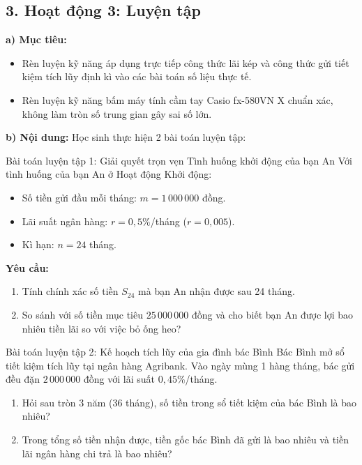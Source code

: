\documentclass[12pt, a4paper]{article}
\begin{document}
\subsection*{3. Hoạt động 3: Luyện tập}

\noindent \textbf{a) Mục tiêu:}
\begin{itemize}
    \item Rèn luyện kỹ năng áp dụng trực tiếp công thức lãi kép và công thức gửi tiết kiệm tích lũy định kì vào các bài toán số liệu thực tế.
    \item Rèn luyện kỹ năng bấm máy tính cầm tay Casio fx-580VN X chuẩn xác, không làm tròn số trung gian gây sai số lớn.
\end{itemize}

\noindent \textbf{b) Nội dung:}
Học sinh thực hiện 2 bài toán luyện tập:

\begin{pedabox}{Bài toán luyện tập 1: Giải quyết trọn vẹn Tình huống khởi động của bạn An}
    Với tình huống của bạn An ở Hoạt động Khởi động:
    \begin{itemize}
        \item Số tiền gửi đầu mỗi tháng: $m = 1\,000\,000$ đồng.
        \item Lãi suất ngân hàng: $r = 0{,}5\%$/tháng ($r = 0{,}005$).
        \item Kì hạn: $n = 24$ tháng.
    \end{itemize}
    \textbf{Yêu cầu:}
    \begin{enumerate}
        \item Tính chính xác số tiền $S_{24}$ mà bạn An nhận được sau 24 tháng.
        \item So sánh với số tiền mục tiêu $25\,000\,000$ đồng và cho biết bạn An được lợi bao nhiêu tiền lãi so với việc bỏ ống heo?
    \end{enumerate}
\end{pedabox}

\begin{pedabox}{Bài toán luyện tập 2: Kế hoạch tích lũy của gia đình bác Bình}
    Bác Bình mở sổ tiết kiệm tích lũy tại ngân hàng Agribank. Vào ngày mùng 1 hàng tháng, bác gửi đều đặn $2\,000\,000$ đồng với lãi suất $0{,}45\%$/tháng.
    \begin{enumerate}
        \item Hỏi sau tròn 3 năm ($36$ tháng), số tiền trong sổ tiết kiệm của bác Bình là bao nhiêu?
        \item Trong tổng số tiền nhận được, tiền gốc bác Bình đã gửi là bao nhiêu và tiền lãi ngân hàng chi trả là bao nhiêu?
    \end{enumerate}
\end{pedabox}
\end{document}
